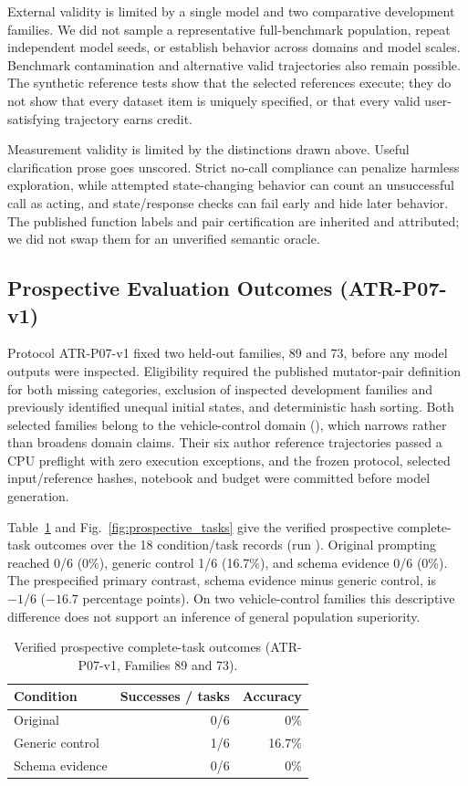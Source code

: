 \documentclass[conference]{IEEEtran}
\newcommand{\code}[1]{\texttt{\detokenize{#1}}}
\begin{document}
External validity is limited by a single model and two comparative development families. We did not sample a representative full-benchmark population, repeat independent model seeds, or establish behavior across domains and model scales. Benchmark contamination and alternative valid trajectories also remain possible. The synthetic reference tests show that the selected references execute; they do not show that every dataset item is uniquely specified, or that every valid user-satisfying trajectory earns credit.

Measurement validity is limited by the distinctions drawn above. Useful clarification prose goes unscored. Strict no-call compliance can penalize harmless exploration, while attempted state-changing behavior can count an unsuccessful call as acting, and state/response checks can fail early and hide later behavior. The published function labels and pair certification are inherited and attributed; we did not swap them for an unverified semantic oracle.

\subsection{Prospective Evaluation Outcomes (ATR-P07-v1)}
Protocol ATR-P07-v1 fixed two held-out families, 89 and 73, before any model outputs were inspected. Eligibility required the published mutator-pair definition for both missing categories, exclusion of inspected development families and previously identified unequal initial states, and deterministic hash sorting. Both selected families belong to the vehicle-control domain (\code{VehicleControlAPI}), which narrows rather than broadens domain claims. Their six author reference trajectories passed a CPU preflight with zero execution exceptions, and the frozen protocol, selected input/reference hashes, notebook and budget were committed before model generation.

Table~\ref{tab:prospective_results} and Fig.~\ref{fig:prospective_tasks} give the verified prospective complete-task outcomes over the 18 condition/task records (run \code{20261117T100033Z-29245346}). Original prompting reached 0/6 (0\%), generic control 1/6 (16.7\%), and schema evidence 0/6 (0\%). The prespecified primary contrast, schema evidence minus generic control, is $-1/6$ ($-16.7$ percentage points). On two vehicle-control families this descriptive difference does not support an inference of general population superiority.

\begin{table}[t]\caption{Verified prospective complete-task outcomes (ATR-P07-v1, Families 89 and 73).}\label{tab:prospective_results}\centering
\begin{tabular}{lrr}\toprule
Condition & Successes / tasks & Accuracy\\\midrule
Original & 0/6 & 0\%\\
Generic control & 1/6 & 16.7\%\\
Schema evidence & 0/6 & 0\%\\\bottomrule
\end{tabular}
\end{table}
\end{document}
